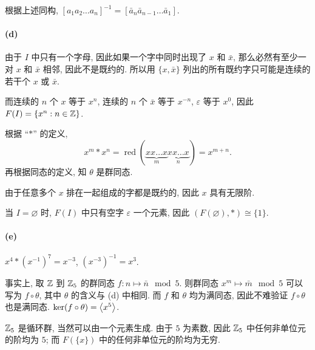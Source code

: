\documentclass{article}
\begin{document}
\begin{solution}
	根据上述同构, $[a_1a_2\dots a_n]^{-1} = [\bar{a}_{n}\bar{a}_{n-1}\dots \bar{a}_1]$.

	\paragraph{(d)} 由于 $I$ 中只有一个字母, 因此如果一个字中同时出现了 $x$ 和 $\bar{x}$, 那么必然有至少一对 $x$ 和 $\bar{x}$ 相邻, 因此不是既约的. 所以用 $\{x, \bar{x}\}$ 列出的所有既约字只可能是连续的若干个 $x$ 或 $\bar{x}$. 

	而连续的 $n$ 个 $x$ 等于 $x^{n}$, 连续的 $n$ 个 $\bar{x}$ 等于 $x^{-n}$, $\varepsilon$ 等于 $x^0$, 因此 $F(I) = \{x^n: n \in \mathbb{Z}\}$. 

	根据 ``$*$'' 的定义, 
	\[ x^m * x^n = \operatorname{red}\left(\underbrace{xx\dots x}\limits_{m} \underbrace{xx\dots x}\limits_{n}\right) = x^{m+n}. \]
	再根据同态的定义, 知 $\theta$ 是群同态.

	由于任意多个 $x$ 排在一起组成的字都是既约的, 因此 $x$ 具有无限阶. 

	当 $I = \varnothing$ 时, $F(I)$ 中只有空字 $\varepsilon$ 一个元素, 因此 $(F(\varnothing), *) \cong \{1\}$. 

	\paragraph{(e)} $x^4 * (x^{-1})^7 = x^{-3}$, $(x^{-3})^{-1} = x^{3}$. 

	事实上, 取 $\mathbb{Z}$ 到 $\mathbb{Z}_5$ 的群同态 $f: n \mapsto \bar{n} \mod 5$. 则群同态 $x^{m} \mapsto \bar{m} \mod 5$ 可以写为 $f \circ \theta$, 其中 $\theta$ 的含义与 (d) 中相同. 而 $f$ 和 $\theta$ 均为满同态, 因此不难验证 $f \circ \theta$ 也是满同态. $\ker (f \circ \theta) = \left\langle x^5 \right\rangle$.

	$\mathbb{Z}_5$ 是循环群, 当然可以由一个元素生成. 由于 $5$ 为素数, 因此 $\mathbb{Z}_5$ 中任何非单位元的阶均为 $5$; 而 $F(\{x\})$ 中的任何非单位元的阶均为无穷.
\end{solution}
\end{document}
